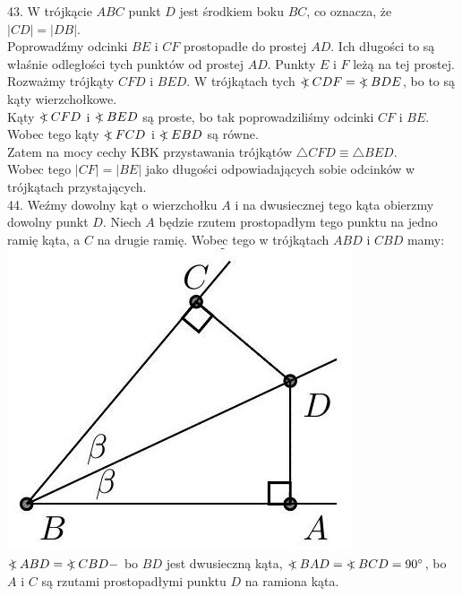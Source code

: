 \documentclass[10pt]{article}
\newcommand\Varangle{\mathop{{<\!\!\!\!\!\text{\small)}}\:}\nolimits}
\begin{document}
43. W trójkącie \(A B C\) punkt \(D\) jest środkiem boku \(B C\), co oznacza, że \(|C D|=|D B|\).\\
Poprowadźmy odcinki \(B E\) i \(C F\) prostopadłe do prostej \(A D\). Ich długości to są właśnie odległości tych punktów od prostej \(A D\). Punkty \(E\) i \(F\) leżą na tej prostej.\\
Rozważmy trójkąty \(C F D\) i \(B E D\). W trójkątach tych \(\Varangle C D F=\Varangle B D E\), bo to są kąty wierzchołkowe.\\
Kąty \(\Varangle C F D\) i \(\Varangle B E D\) są proste, bo tak poprowadziliśmy odcinki \(C F\) i \(B E\). Wobec tego kąty \(\Varangle F C D\) i \(\Varangle E B D\) są równe.\\
Zatem na mocy cechy KBK przystawania trójkątów \(\triangle C F D \equiv \triangle B E D\).\\
Wobec tego \(|C F|=|B E|\) jako długości odpowiadających sobie odcinków w trójkątach przystających.\\
44. Weźmy dowolny kąt o wierzchołku \(A\) i na dwusiecznej tego kąta obierzmy dowolny punkt \(D\). Niech \(A\) będzie rzutem prostopadłym tego punktu na jedno ramię kąta, a \(C\) na drugie ramię. Wobec tego w trójkątach \(A B D\) i \(C B D\) mamy:\\
\includegraphics[max width=\textwidth, center]{2024_11_21_71f62bd117d375398909g-068}\\
\(\Varangle A B D=\Varangle C B D-\) bo \(B D\) jest dwusieczną kąta, \(\Varangle B A D=\Varangle B C D=90^{\circ}\), bo \(A\) i \(C\) są rzutami prostopadłymi punktu \(D\) na ramiona kąta.\\
\end{document}
